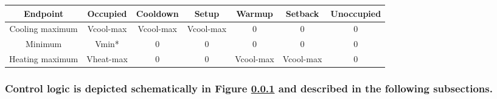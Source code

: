 \documentclass[letterpaper]{article}
\begin{document}
\begin{tabular}{ c|c|c|c|c|c|c } 
 \hline
 Endpoint & Occupied & Cooldown & Setup & Warmup & Setback & Unoccupied \\ 
 \hline
 Cooling maximum & Vcool-max & Vcool-max & Vcool-max & 0 & 0 & 0 \\ 
 \hline
 Minimum & Vmin* & 0 & 0 & 0 & 0 & 0 \\ 
 \hline
 Heating maximum & Vheat-max & 0 & 0 & Vcool-max & Vcool-max & 0 \\ 
 \hline
\end{tabular}

\subsubsection{Control logic is depicted schematically in Figure \ref{fig:control_logic} and described in the following subsections.} \label{fig:control_logic}

\begin{figure}
  \centering
  
\end{figure}

\ifdefined\BuildingsTemplatesAirHandlersFansInterfacesPartialAirHandlertypFanRet
\fi
\end{document}
